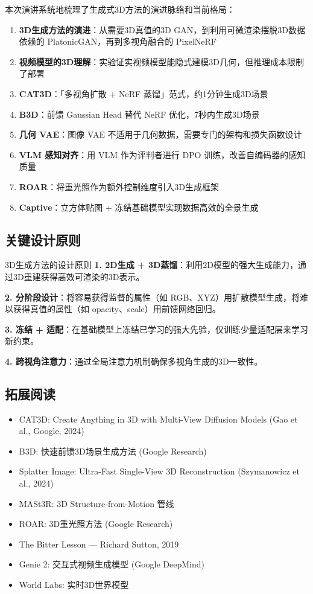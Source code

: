 \documentclass[a4paper]{article}
\begin{document}
本次演讲系统地梳理了生成式3D方法的演进脉络和当前格局：

\begin{enumerate}
    \item \textbf{3D生成方法的演进}：从需要3D真值的3D GAN，到利用可微渲染摆脱3D数据依赖的 PlatonicGAN，再到多视角融合的 PixelNeRF
    \item \textbf{视频模型的3D理解}：实验证实视频模型能隐式建模3D几何，但推理成本限制了部署
    \item \textbf{CAT3D}：「多视角扩散 + NeRF 蒸馏」范式，约1分钟生成3D场景
    \item \textbf{B3D}：前馈 Gaussian Head 替代 NeRF 优化，7秒内生成3D场景
    \item \textbf{几何 VAE}：图像 VAE 不适用于几何数据，需要专门的架构和损失函数设计
    \item \textbf{VLM 感知对齐}：用 VLM 作为评判者进行 DPO 训练，改善自编码器的感知质量
    \item \textbf{ROAR}：将重光照作为额外控制维度引入3D生成框架
    \item \textbf{Captive}：立方体贴图 + 冻结基础模型实现数据高效的全景生成
\end{enumerate}

\subsection{关键设计原则}

\begin{importantbox}{3D生成方法的设计原则}
\textbf{1. 2D生成 + 3D蒸馏}：利用2D模型的强大生成能力，通过3D重建获得高效可渲染的3D表示。

\textbf{2. 分阶段设计}：将容易获得监督的属性（如 RGB、XYZ）用扩散模型生成，将难以获得真值的属性（如 opacity、scale）用前馈网络回归。

\textbf{3. 冻结 + 适配}：在基础模型上冻结已学习的强大先验，仅训练少量适配层来学习新约束。

\textbf{4. 跨视角注意力}：通过全局注意力机制确保多视角生成的3D一致性。
\end{importantbox}

\subsection{拓展阅读}

\begin{itemize}
    \item CAT3D: Create Anything in 3D with Multi-View Diffusion Models (Gao et al., Google, 2024)
    \item B3D: 快速前馈3D场景生成方法 (Google Research)
    \item Splatter Image: Ultra-Fast Single-View 3D Reconstruction (Szymanowicz et al., 2024)
    \item MASt3R: 3D Structure-from-Motion 管线
    \item ROAR: 3D重光照方法 (Google Research)
    \item The Bitter Lesson --- Richard Sutton, 2019
    \item Genie 2: 交互式视频生成模型 (Google DeepMind)
    \item World Labs: 实时3D世界模型
\end{itemize}

\end{document}
